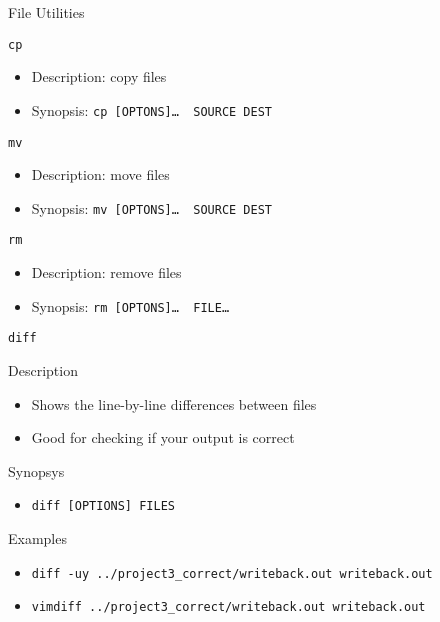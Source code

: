 \documentclass[table,dvipsnames]{beamer}
\begin{document}
\begin{frame}{File Utilities}
	\begin{block}{\texttt{cp}}
		\begin{itemize}
			\item Description: copy files
			\item Synopsis: \texttt{cp [OPTONS]\dots~ SOURCE DEST}
		\end{itemize}
	\end{block}
	\begin{block}{\texttt{mv}}
		\begin{itemize}
			\item Description: move files
			\item Synopsis: \texttt{mv [OPTONS]\dots~ SOURCE DEST}
		\end{itemize}
	\end{block}
	\begin{block}{\texttt{rm}}
		\begin{itemize}
			\item Description: remove files
			\item Synopsis: \texttt{rm [OPTONS]\dots~ FILE\dots}
		\end{itemize}
	\end{block}
\end{frame}

\begin{frame}{\texttt{diff}}
	\begin{block}{Description}
		\begin{itemize}
			\item Shows the line-by-line differences between files
			\item Good for checking if your output is correct
		\end{itemize}
	\end{block}
	\begin{block}{Synopsys}
		\begin{itemize}
			\item \texttt{diff [OPTIONS] FILES}
		\end{itemize}
	\end{block}
	\begin{block}{Examples}
		\begin{itemize}
			\item \texttt{diff -uy ../project3\_correct/writeback.out
				writeback.out}
			\item \texttt{vimdiff ../project3\_correct/writeback.out
				writeback.out}
		\end{itemize}
	\end{block}
\end{frame}
\end{document}
